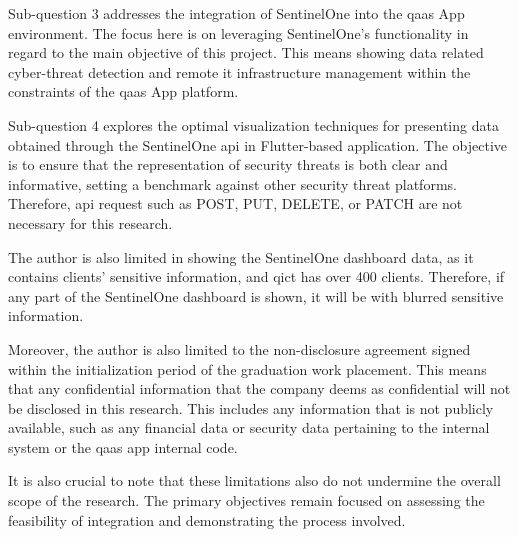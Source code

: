 Sub-question 3 addresses the integration of SentinelOne into the \acrshort{qaas} App environment. The focus here is on leveraging
SentinelOne's functionality in regard to the main objective of this project. This means showing data related cyber-threat detection and
remote \acrshort{it} infrastructure management within the constraints of the \acrshort{qaas} App platform.

Sub-question 4 explores the optimal visualization techniques for presenting data obtained through the SentinelOne \acrshort{api} in
Flutter-based application. The objective is to ensure that the representation of security threats is both clear and informative, setting a
benchmark against other security threat platforms. Therefore, \acrshort{api} request such as POST, PUT, DELETE, or PATCH are not necessary for
this research.

The author is also limited in showing the SentinelOne dashboard data, as it contains clients' sensitive
information, and \acrshort{qict} has over 400 clients. Therefore, if any part of the SentinelOne dashboard is
shown, it will be with blurred sensitive information.

Moreover, the author is also limited to the non-disclosure agreement signed within the initialization period of
the graduation work placement. This means that any confidential information that the company deems as confidential
will not be disclosed in this research. This includes any information that is not publicly available, such as any
financial data or security data pertaining to the internal system or the \acrshort{qaas} app internal code.

It is also crucial to note that these limitations also do not undermine the overall scope of the research. The
primary objectives remain focused on assessing the feasibility of integration and demonstrating the process involved.
